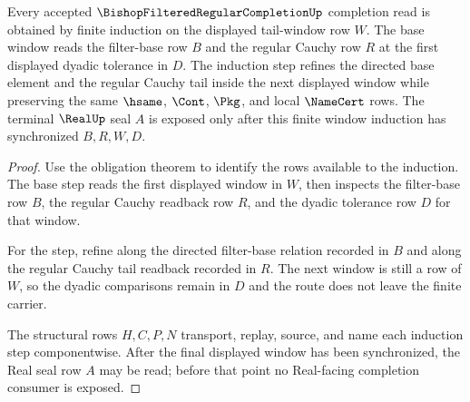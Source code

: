 \begin{theorem}
\label{thm:bishop-filtered-regular-completion-filter-window-induction}
Every accepted $\BishopFilteredRegularCompletionUp$ completion read is obtained by finite induction on the displayed tail-window row $W$. The base window reads the filter-base row $B$ and the regular Cauchy row $R$ at the first displayed dyadic tolerance in $D$. The induction step refines the directed base element and the regular Cauchy tail inside the next displayed window while preserving the same $\hsame$, $\Cont$, $\Pkg$, and local $\NameCert$ rows. The terminal $\RealUp$ seal $A$ is exposed only after this finite window induction has synchronized $B,R,W,D$.
\end{theorem}
\begin{proof}
Use the obligation theorem to identify the rows available to the induction. The base step reads the first displayed window in $W$, then inspects the filter-base row $B$, the regular Cauchy readback row $R$, and the dyadic tolerance row $D$ for that window.

For the step, refine along the directed filter-base relation recorded in $B$ and along the regular Cauchy tail readback recorded in $R$. The next window is still a row of $W$, so the dyadic comparisons remain in $D$ and the route does not leave the finite carrier.

The structural rows $H,C,P,N$ transport, replay, source, and name each induction step componentwise. After the final displayed window has been synchronized, the Real seal row $A$ may be read; before that point no Real-facing completion consumer is exposed.
\end{proof}



